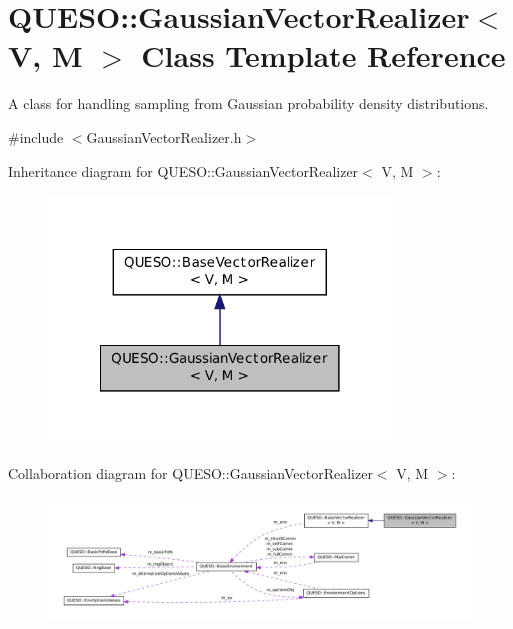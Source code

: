 \hypertarget{class_q_u_e_s_o_1_1_gaussian_vector_realizer}{\section{Q\-U\-E\-S\-O\-:\-:Gaussian\-Vector\-Realizer$<$ V, M $>$ Class Template Reference}
\label{class_q_u_e_s_o_1_1_gaussian_vector_realizer}
}


A class for handling sampling from Gaussian probability density distributions.  




{\ttfamily \#include $<$Gaussian\-Vector\-Realizer.\-h$>$}



Inheritance diagram for Q\-U\-E\-S\-O\-:\-:Gaussian\-Vector\-Realizer$<$ V, M $>$\-:
\nopagebreak
\begin{figure}[H]
\begin{center}
\leavevmode
\includegraphics[width=258pt]{class_q_u_e_s_o_1_1_gaussian_vector_realizer__inherit__graph}
\end{center}
\end{figure}


Collaboration diagram for Q\-U\-E\-S\-O\-:\-:Gaussian\-Vector\-Realizer$<$ V, M $>$\-:
\nopagebreak
\begin{figure}[H]
\begin{center}
\leavevmode
\includegraphics[width=350pt]{class_q_u_e_s_o_1_1_gaussian_vector_realizer__coll__graph}
\end{center}
\end{figure}
